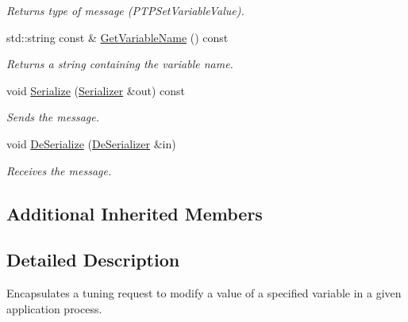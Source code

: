 \begin{DoxyCompactItemize}
\begin{DoxyCompactList}\small\item\em Returns type of message (P\-T\-P\-Set\-Variable\-Value). \end{DoxyCompactList}\item 
\hypertarget{class_common_1_1_set_variable_value_request_ac39a95281f91ac848f816ade953f5b61}{std\-::string const \& \hyperlink{class_common_1_1_set_variable_value_request_ac39a95281f91ac848f816ade953f5b61}{Get\-Variable\-Name} () const }\label{class_common_1_1_set_variable_value_request_ac39a95281f91ac848f816ade953f5b61}

\begin{DoxyCompactList}\small\item\em Returns a string containing the variable name. \end{DoxyCompactList}\item 
\hypertarget{class_common_1_1_set_variable_value_request_a178e46256dcf6cd70193af3b688f5fb4}{void \hyperlink{class_common_1_1_set_variable_value_request_a178e46256dcf6cd70193af3b688f5fb4}{Serialize} (\hyperlink{class_common_1_1_serializer}{Serializer} \&out) const }\label{class_common_1_1_set_variable_value_request_a178e46256dcf6cd70193af3b688f5fb4}

\begin{DoxyCompactList}\small\item\em Sends the message. \end{DoxyCompactList}\item 
\hypertarget{class_common_1_1_set_variable_value_request_a042efd853ec134636a28775c304802df}{void \hyperlink{class_common_1_1_set_variable_value_request_a042efd853ec134636a28775c304802df}{De\-Serialize} (\hyperlink{class_common_1_1_de_serializer}{De\-Serializer} \&in)}\label{class_common_1_1_set_variable_value_request_a042efd853ec134636a28775c304802df}

\begin{DoxyCompactList}\small\item\em Receives the message. \end{DoxyCompactList}\end{DoxyCompactItemize}
\subsection*{Additional Inherited Members}


\subsection{Detailed Description}
Encapsulates a tuning request to modify a value of a specified variable in a given application process. 


